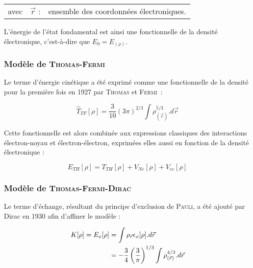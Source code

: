 \documentclass[12pt,a4paper]{book}
\begin{document}
	\begin{flushleft}
		\begin{tabular}{@{}lrp{10cm}}
			avec & $\vec{r}$ : & ensemble des coordonnées électroniques. 
		\end{tabular}
	\end{flushleft}
	
	
	L'énergie de l'état fondamental est ainsi une fonctionnelle de la densité électronique, c'est-à-dire que $E_{0} = E_{(\rho)}$.
	
	\subsubsection{Modèle de \textsc{Thomas-Fermi}}
	
	Le terme d'énergie cinétique a été exprimé comme une fonctionnelle de la densité pour la première fois en 1927 par \textsc{Thomas} et \textsc{Fermi}~:
	
	\begin{equation}
	\hat{T}_{TF}[\rho] = \frac{3}{10} (3\pi)^{2/3} \int \rho_{(\vec{r})}^{5/3} .d\vec{r}
	\label{ener_cin_thom_ferm}
	\end{equation}
	
	Cette fonctionnelle est alors combinée aux expressions classiques des interactions électron-noyau et électron-électron, exprimées elles aussi en fonction de la densité électronique :
	
	\begin{equation}
	E_{TH}[\rho] = T_{TH}[\rho] + V_{Ne}[\rho] + V_{ee}[\rho]
	\end{equation}
	
	\subsubsection{Modèle de \textsc{Thomas-Fermi-Dirac}}
	
	Le terme d'échange, résultant du principe d'exclusion de \textsc{Pauli}, a été ajouté par Dirac en 1930 afin d'affiner le modèle :
	
	\begin{align}
	K[\rho] = E_{x}[\rho] &= \int \rho_{\vec{r}} \epsilon_{x}[\rho] .d\vec{r} \\
	&= -\frac{3}{4} \left(\frac{3}{\pi}\right)^{1/3} \int \rho_{(\vec{r})}^{4/3} .d\vec{r} \notag
	\end{align}
	
\end{document}
